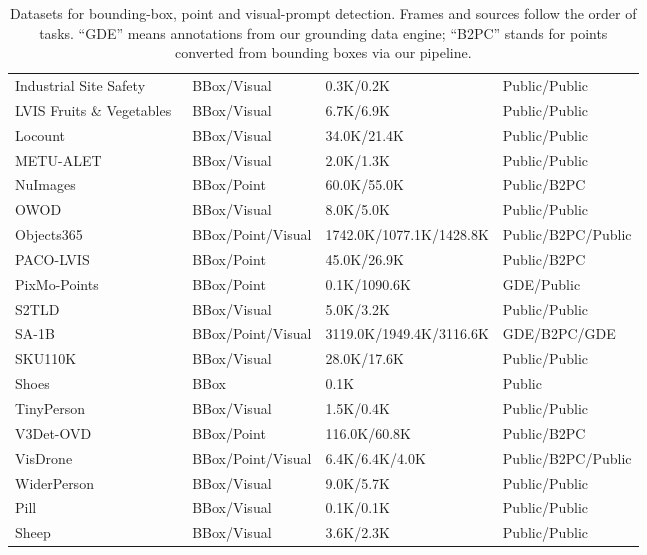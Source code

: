 \begin{table}[htbp]
\begin{tabular}{l|l|l|l}
        Industrial Site Safety~\cite{chappieut_industrial_site_safety_detection_v1_2026} & BBox/Visual & 0.3K/0.2K & Public/Public \\
        LVIS Fruits \& Vegetables~\cite{henningheyen_lvis_fruits_and_vegetables_2026} & BBox/Visual & 6.7K/6.9K & Public/Public \\
        Locount~\cite{Cai2020Locount} & BBox/Visual & 34.0K/21.4K & Public/Public \\
        METU-ALET~\cite{METU_ALET} & BBox/Visual & 2.0K/1.3K & Public/Public \\
        NuImages~\cite{Fong2025nuScenesRP} & BBox/Point & 60.0K/55.0K & Public/B2PC \\
        OWOD~\cite{open_world_dense_object_detection} & BBox/Visual & 8.0K/5.0K & Public/Public \\
        Objects365~\cite{shao2019objects365} & BBox/Point/Visual & 1742.0K/1077.1K/1428.8K & Public/B2PC/Public \\
        PACO-LVIS~\cite{ramanathan2023paco} & BBox/Point & 45.0K/26.9K & Public/B2PC \\
        PixMo-Points~\cite{Deitke2024MolmoAP} & BBox/Point & 0.1K/1090.6K & GDE/Public \\
        S2TLD~\cite{yang2022scrdet++} & BBox/Visual & 5.0K/3.2K & Public/Public \\
        SA-1B~\cite{sam} & BBox/Point/Visual & 3119.0K/1949.4K/3116.6K & GDE/B2PC/GDE \\
        SKU110K~\cite{goldman2019dense} & BBox/Visual & 28.0K/17.6K & Public/Public \\
        Shoes~\cite{kukreti_shoe_dataset_2021} & BBox & 0.1K & Public \\
        TinyPerson~\cite{yu2020scale} & BBox/Visual & 1.5K/0.4K & Public/Public \\
        V3Det-OVD~\cite{wang2023v3det} & BBox/Point & 116.0K/60.8K & Public/B2PC \\
        VisDrone~\cite{zhu2021detection} & BBox/Point/Visual & 6.4K/6.4K/4.0K & Public/B2PC/Public \\
        WiderPerson~\cite{zhang2019widerperson} & BBox/Visual & 9.0K/5.7K & Public/Public \\
        Pill~\cite{Jocher_Ultralytics_Datasets_2024} & BBox/Visual & 0.1K/0.1K & Public/Public \\
        Sheep~\cite{aerial-sheep_dataset} & BBox/Visual & 3.6K/2.3K & Public/Public \\
        \bottomrule
    \end{tabular}
    \caption{
        Datasets for bounding-box, point and visual-prompt detection.
        Frames and sources follow the order of tasks.
        “GDE” means annotations from our grounding data engine; “B2PC” stands for points converted from bounding boxes via our pipeline.
    }
    \label{tab:detection-visual-prompt-datasets}
\end{table}

